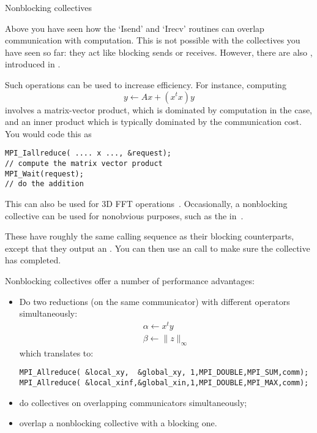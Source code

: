 
 {Nonblocking collectives}
\label{sec:mpi3collect}

Above you have seen how the `Isend' and `Irecv' routines can overlap communication
with computation. This is not possible with the collectives you have seen so far:
they act like blocking sends or receives.
However, there are also ,
introduced in .

Such operations can be used to increase efficiency.
For instance, computing
\[ y \leftarrow Ax + (x^tx)y \]
involves a matrix-vector product, which is dominated by computation
in the  case, and an inner product which is 
typically dominated by the communication cost. You would code this as
\begin{lstlisting}
MPI_Iallreduce( .... x ..., &request);
// compute the matrix vector product
MPI_Wait(request);
// do the addition
\end{lstlisting}

This can also be used for 3D FFT operations~\cite{Hoefler:case-for-nbc}.
Occasionally, a nonblocking collective can be used for nonobvious purposes,
such as the  in~\cite{Hoefler:2010:SCP}.

These have roughly the same calling sequence as their blocking counterparts,
except that they output an . You
can then use an  call to make sure the collective
has completed.

Nonblocking collectives offer a number of performance advantages:
\begin{itemize}
\item Do two reductions (on the same communicator) with different
  operators simultaneously:
\[ 
\begin{array}{l}
  \alpha\leftarrow x^ty\\
  \beta\leftarrow \|z\|_\infty
\end{array}
\]
which translates to:
\begin{lstlisting}
MPI_Allreduce( &local_xy,  &global_xy, 1,MPI_DOUBLE,MPI_SUM,comm);
MPI_Allreduce( &local_xinf,&global_xin,1,MPI_DOUBLE,MPI_MAX,comm);
\end{lstlisting}
\item do collectives on overlapping communicators simultaneously;
\item overlap a nonblocking collective with a blocking one.
\end{itemize}

